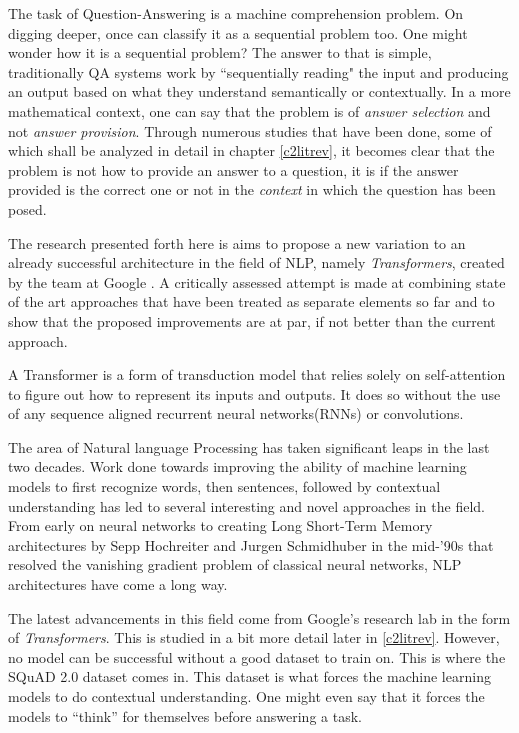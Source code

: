 \documentclass[a4paper,12pt]{report}
\begin{document}
		    The task of Question-Answering is a machine comprehension problem. On digging deeper, once can classify it as a sequential problem too. One might wonder how it is a sequential problem? The answer to that is simple, traditionally QA systems work by ``sequentially reading" the input and producing an output based on what they understand semantically or contextually.
		    In a more mathematical context, one can say that the problem is of \textit{answer selection} and not \textit{answer provision}. Through numerous studies that have been done, some of which shall be analyzed in detail in chapter \ref{c2litrev}, it becomes clear that the problem is not how to provide an answer to a question, it is if the answer provided is the correct one or not in the \textit{context} in which the question has been posed.

		    The research presented forth here is aims to propose a new variation to an already successful architecture in the field of NLP, namely \textit{Transformers}, created by the team at Google \citep{atayl}. A critically assessed attempt is made at combining state of the art approaches that have been treated as separate elements so far and to show that the proposed improvements are at par, if not better than the current approach.

		    A Transformer is a form of transduction model that relies solely on self-attention to figure out how to represent its inputs and outputs. It does so without the use of any sequence aligned recurrent neural networks(RNNs) or convolutions.

            The area of Natural language Processing has taken significant leaps in the last two decades. Work done towards improving the ability of machine learning models to first recognize words, then sentences, followed by contextual understanding has led to several interesting and novel approaches in the field. From early on neural networks to creating Long Short-Term Memory architectures \citep{lstmoriginal} by Sepp Hochreiter and Jurgen Schmidhuber in the mid-'90s that resolved the vanishing gradient problem of classical neural networks, NLP architectures have come a long way.

           The latest advancements in this field come from Google's research lab in the form of \textit{Transformers}. This is studied in a bit more detail later in \ref{c2litrev}. However, no model can be successful without a good dataset to train on. This is where the SQuAD 2.0 dataset \citep{dataset} comes in. This dataset is what forces the machine learning models to do contextual understanding. One might even say that it forces the models to ``think'' for themselves before answering a task.
\end{document}
